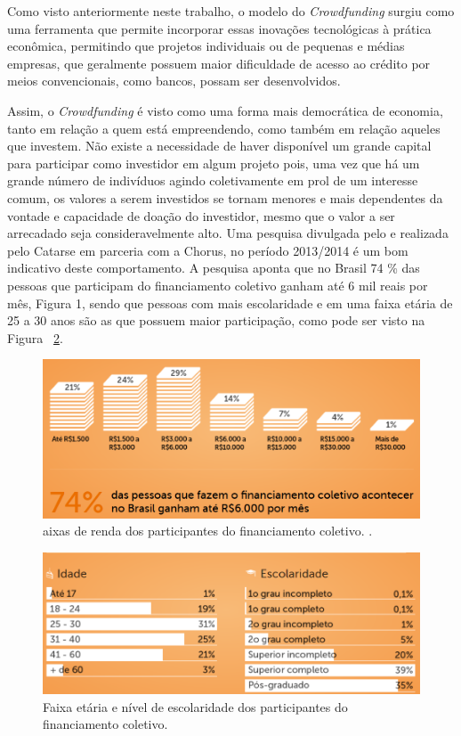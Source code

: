 \documentclass{classe_cn}                 %
\begin{document}
Como visto anteriormente neste trabalho, o modelo do \textit{Crowdfunding} surgiu como uma ferramenta que permite incorporar essas inovações tecnológicas à prática econômica, permitindo que projetos individuais ou de pequenas e médias empresas, que geralmente possuem maior dificuldade de acesso ao crédito por meios convencionais, como bancos, possam ser desenvolvidos.

Assim, o \textit{Crowdfunding}  é visto como uma forma mais democrática de economia, tanto em relação a quem está empreendendo, como também em relação aqueles que investem. Não existe a necessidade de haver disponível um grande capital para participar como investidor em algum projeto pois, uma vez que há um grande número de indivíduos agindo coletivamente em prol de um interesse comum, os valores a serem investidos se tornam menores e mais dependentes da vontade e capacidade de doação do investidor, mesmo que o valor a ser arrecadado seja consideravelmente alto. Uma pesquisa divulgada pelo \cite{SEBRAE:2017} e realizada pelo Catarse em parceria com a Chorus, no período 2013/2014 é um bom indicativo deste comportamento. A pesquisa aponta que no Brasil 74 \% das pessoas que participam do financiamento coletivo ganham até 6 mil reais por mês, Figura 1, sendo que pessoas com mais escolaridade e em uma faixa etária de 25 a 30 anos são as que possuem maior participação, como pode ser visto na Figura ~\ref{figura_2}.

\begin{figure}[!htb]
\centering
\includegraphics[scale=0.5]{fg1.png}
\caption{aixas de renda dos participantes do financiamento coletivo. \cite{CARTASECHORUS:2017}.}
\label{figura_1}
\end{figure}

\begin{figure}[!htb]
\centering
\includegraphics[scale=0.5]{fg2.png}
\caption{Faixa etária e nível de escolaridade dos participantes do financiamento coletivo\cite{CARTASECHORUS:2017}.}
\label{figura_2}
\end{figure}
\end{document}
